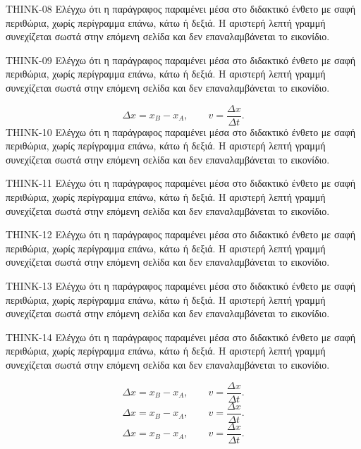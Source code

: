 \begin{ThinkBox}
THINK-08 Ελέγχω ότι η παράγραφος παραμένει μέσα στο διδακτικό ένθετο με σαφή περιθώρια, χωρίς περίγραμμα επάνω, κάτω ή δεξιά. Η αριστερή λεπτή γραμμή συνεχίζεται σωστά στην επόμενη σελίδα και δεν επαναλαμβάνεται το εικονίδιο.\par
THINK-09 Ελέγχω ότι η παράγραφος παραμένει μέσα στο διδακτικό ένθετο με σαφή περιθώρια, χωρίς περίγραμμα επάνω, κάτω ή δεξιά. Η αριστερή λεπτή γραμμή συνεχίζεται σωστά στην επόμενη σελίδα και δεν επαναλαμβάνεται το εικονίδιο.\par
\[\Delta x=x_B-x_A,\qquad v=\frac{\Delta x}{\Delta t}.\]
THINK-10 Ελέγχω ότι η παράγραφος παραμένει μέσα στο διδακτικό ένθετο με σαφή περιθώρια, χωρίς περίγραμμα επάνω, κάτω ή δεξιά. Η αριστερή λεπτή γραμμή συνεχίζεται σωστά στην επόμενη σελίδα και δεν επαναλαμβάνεται το εικονίδιο.\par
THINK-11 Ελέγχω ότι η παράγραφος παραμένει μέσα στο διδακτικό ένθετο με σαφή περιθώρια, χωρίς περίγραμμα επάνω, κάτω ή δεξιά. Η αριστερή λεπτή γραμμή συνεχίζεται σωστά στην επόμενη σελίδα και δεν επαναλαμβάνεται το εικονίδιο.\par
THINK-12 Ελέγχω ότι η παράγραφος παραμένει μέσα στο διδακτικό ένθετο με σαφή περιθώρια, χωρίς περίγραμμα επάνω, κάτω ή δεξιά. Η αριστερή λεπτή γραμμή συνεχίζεται σωστά στην επόμενη σελίδα και δεν επαναλαμβάνεται το εικονίδιο.\par
THINK-13 Ελέγχω ότι η παράγραφος παραμένει μέσα στο διδακτικό ένθετο με σαφή περιθώρια, χωρίς περίγραμμα επάνω, κάτω ή δεξιά. Η αριστερή λεπτή γραμμή συνεχίζεται σωστά στην επόμενη σελίδα και δεν επαναλαμβάνεται το εικονίδιο.\par
THINK-14 Ελέγχω ότι η παράγραφος παραμένει μέσα στο διδακτικό ένθετο με σαφή περιθώρια, χωρίς περίγραμμα επάνω, κάτω ή δεξιά. Η αριστερή λεπτή γραμμή συνεχίζεται σωστά στην επόμενη σελίδα και δεν επαναλαμβάνεται το εικονίδιο.\par
\[\Delta x=x_B-x_A,\qquad v=\frac{\Delta x}{\Delta t}.\]
\[\Delta x=x_B-x_A,\qquad v=\frac{\Delta x}{\Delta t}.\]
\[\Delta x=x_B-x_A,\qquad v=\frac{\Delta x}{\Delta t}.\]
\end{ThinkBox}
\clearpage
